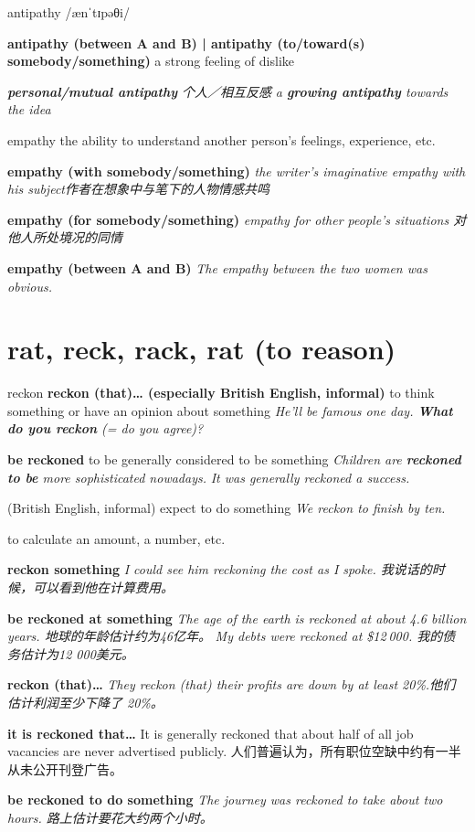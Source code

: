 \begin{DefWord}{antipathy}
    /ænˈtɪpəθi/

    \textbf{antipathy (between A and B) | antipathy (to/toward(s) somebody/something)} a strong feeling of dislike

    \textit{\textbf{personal/mutual antipathy} 个人／相互反感}
    \textit{a \textbf{growing antipathy} towards the idea}
\end{DefWord}

\begin{DefWord}{empathy}
    the ability to understand another person’s feelings, experience, etc.

    \textbf{empathy (with somebody/something)} 
    \textit{the writer’s imaginative empathy with his subject作者在想象中与笔下的人物情感共鸣}
 
    \textbf{empathy (for somebody/something) }
    \textit{empathy for other people’s situations 对他人所处境况的同情}

    \textbf{empathy (between A and B)} 
    \textit{The empathy between the two women was obvious.}
\end{DefWord}

\section{rat, reck, rack, rat (to reason)}

\begin{DefWord}{reckon}
    \textbf{reckon (that)… (especially British English, informal)} to think something or have an opinion about something
    \textit{He'll be famous one day. \textbf{What do you reckon} (= do you agree)?}

    \textbf{be reckoned} to be generally considered to be something
    \textit{Children are \textbf{reckoned to be} more sophisticated nowadays.}
    \textit{It was generally reckoned a success.}

    (British English, informal) expect to do something
    \textit{We reckon to finish by ten.}

    to calculate an amount, a number, etc.

    \textbf{reckon something} 
    \textit{I could see him reckoning the cost as I spoke. 我说话的时候，可以看到他在计算费用。}

    \textbf{be reckoned at something} \textit{The age of the earth is reckoned at about 4.6 billion years. 地球的年龄估计约为46亿年。}
    \textit{My debts were reckoned at \$12 000. 我的债务估计为12 000美元。}

    \textbf{reckon (that)…} \textit{They reckon (that) their profits are down by at least 20\%.他们估计利润至少下降了 20\%。}

    \textbf{it is reckoned that…} It is generally reckoned that about half of all job vacancies are never advertised publicly. 人们普遍认为，所有职位空缺中约有一半从未公开刊登广告。

    \textbf{be reckoned to do something} \textit{The journey was reckoned to take about two hours. 路上估计要花大约两个小时。}
\end{DefWord}

